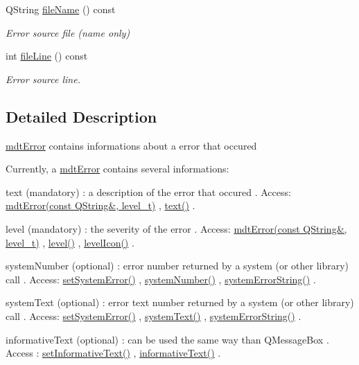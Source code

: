\begin{DoxyCompactItemize}
Q\-String \hyperlink{classmdt_error_af7c2c371678ebd45698a990502addbd8}{file\-Name} () const 
\begin{DoxyCompactList}\small\item\em Error source file (name only) \end{DoxyCompactList}\item 
int \hyperlink{classmdt_error_a7f5a9ac5e896ba24009bcadddcfe79cb}{file\-Line} () const 
\begin{DoxyCompactList}\small\item\em Error source line. \end{DoxyCompactList}\end{DoxyCompactItemize}


\subsection{Detailed Description}
\hyperlink{classmdt_error}{mdt\-Error} contains informations about a error that occured 

Currently, a \hyperlink{classmdt_error}{mdt\-Error} contains several informations\-:
\begin{DoxyItemize}
\item text (mandatory) \-: a description of the error that occured . Access\-: \hyperlink{classmdt_error_a775542a251ef746f3433e7d790a48d85}{mdt\-Error(const Q\-String\&, level\-\_\-t)} , \hyperlink{classmdt_error_a8630bb6b21b70edfe3d13eaff82a1baf}{text()} .
\item level (mandatory) \-: the severity of the error . Access\-: \hyperlink{classmdt_error_a775542a251ef746f3433e7d790a48d85}{mdt\-Error(const Q\-String\&, level\-\_\-t)} , \hyperlink{classmdt_error_a8d8382d3008de890689df415deb7766e}{level()} , \hyperlink{classmdt_error_aac5a7cec9a5d4364f9331c80e1eafe99}{level\-Icon()} .
\item system\-Number (optional) \-: error number returned by a system (or other library) call . Access\-: \hyperlink{classmdt_error_a49254fdb566fee1a4adafe6a3694befc}{set\-System\-Error()} , \hyperlink{classmdt_error_a1be3f45cd56b3142f50c288df9f53204}{system\-Number()} , \hyperlink{classmdt_error_a28d22c0b9341faacfef22a7deae2da3c}{system\-Error\-String()} .
\item system\-Text (optional) \-: error text number returned by a system (or other library) call . Access\-: \hyperlink{classmdt_error_a49254fdb566fee1a4adafe6a3694befc}{set\-System\-Error()} , \hyperlink{classmdt_error_a6cd449e657f321b86d234269b5e92cda}{system\-Text()} , \hyperlink{classmdt_error_a28d22c0b9341faacfef22a7deae2da3c}{system\-Error\-String()} .
\item informative\-Text (optional) \-: can be used the same way than Q\-Message\-Box . Access \-: \hyperlink{classmdt_error_a8ef108a0502df7875f1b54bbb2a8919d}{set\-Informative\-Text()} , \hyperlink{classmdt_error_adcc1905f585c327cec8a2e31af616651}{informative\-Text()} .
\end{DoxyItemize}

